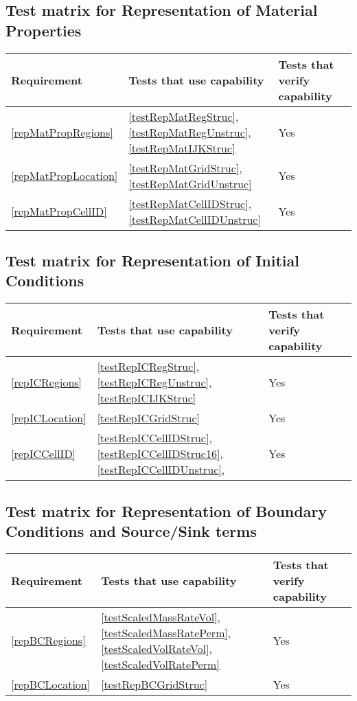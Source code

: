 \subsection{Test matrix for Representation of Material Properties}
\begin{tabular}{|l|l|l|l|}
	\hline
	Requirement & Tests that use capability & Tests that verify capability \\
	\hline
	\hline
	\ref{repMatPropRegions} & \ref{testRepMatRegStruc}, \ref{testRepMatRegUnstruc}, \ref{testRepMatIJKStruc}  & Yes\\
	\hline
	\ref{repMatPropLocation} & \ref{testRepMatGridStruc}, \ref{testRepMatGridUnstruc} & Yes \\
	\hline
	\ref{repMatPropCellID} & \ref{testRepMatCellIDStruc}, \ref{testRepMatCellIDUnstruc} & Yes \\
	\hline
\end{tabular}

\subsection{Test matrix for Representation of Initial Conditions}
\begin{tabular}{|l|l|l|l|}
	\hline
	Requirement & Tests that use capability & Tests that verify capability \\
	\hline
	\hline
	\ref{repICRegions} & \ref{testRepICRegStruc}, \ref{testRepICRegUnstruc}, \ref{testRepICIJKStruc}  & Yes \\
	\hline
	\ref{repICLocation} &  \ref{testRepICGridStruc} & Yes \\
	\hline
	\ref{repICCellID} & \ref{testRepICCellIDStruc}, \ref{testRepICCellIDStruc16}, \ref{testRepICCellIDUnstruc}, & Yes\\
	\hline
\end{tabular}

\subsection{Test matrix for Representation of Boundary Conditions and Source/Sink terms}
\begin{tabular}{|l|l|l|l|}
	\hline
	Requirement & Tests that use capability & Tests that verify capability \\
	\hline
	\hline
	\ref{repBCRegions}& \ref{testScaledMassRateVol}, \ref{testScaledMassRatePerm}, 
	\ref {testScaledVolRateVol}, \ref{testScaledVolRatePerm} & Yes \\
	\hline
	\ref{repBCLocation} & \ref{testRepBCGridStruc} & Yes \\
	\hline
\end{tabular}

